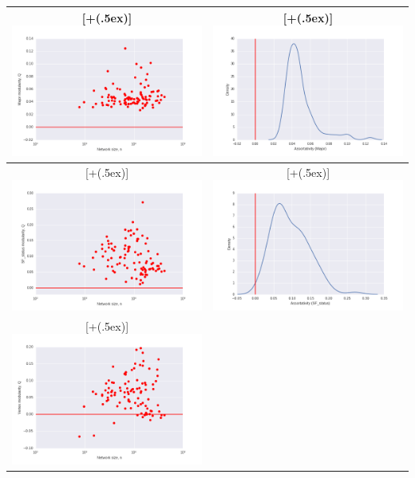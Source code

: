 \documentclass{article}
\newcommand*{\addheight}[2][.5ex]{%
  \raisebox{0pt}[\dimexpr\height+(#1)\relax]{#2}%
}
\begin{document}
\begin{table}[H]
\centering
\begin{tabular}{|c|c|}
	\hline
	\addheight{\includegraphics[width=70mm]{images/Major.png}} &
	\addheight{\includegraphics[width=70mm]{images/Major_density.png}} \\
	\hline   
    \addheight{\includegraphics[width=70mm]{images/SF_status.png}} &
    \addheight{\includegraphics[width=70mm]{images/SF_status_density.png}} \\
    \hline
    \addheight{\includegraphics[width=70mm]{images/Vertex.png}} &

\end{tabular}
\end{table}
\end{document}
